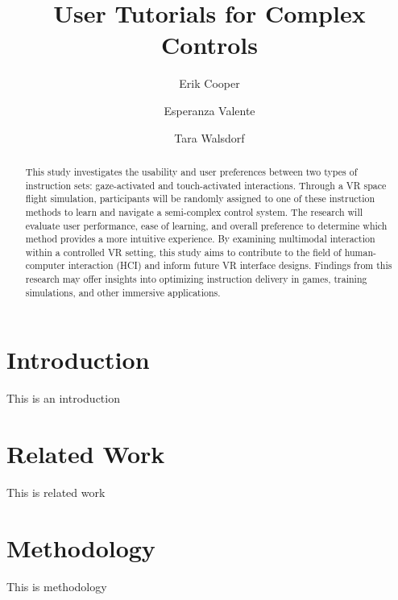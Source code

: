 \documentclass[acmlarge]{acmart}
\begin{document}
\title{User Tutorials for Complex Controls}

\author{Erik Cooper}

\author{Esperanza Valente}

\author{Tara Walsdorf}


\begin{abstract}
  This study investigates the usability and user preferences between two types of instruction sets: gaze-activated and touch-activated interactions. Through a VR space flight simulation, participants will be randomly assigned to one of these instruction methods to learn and navigate a semi-complex control system. The research will evaluate user performance, ease of learning, and overall preference to determine which method provides a more intuitive experience. By examining multimodal interaction within a controlled VR setting, this study aims to contribute to the field of human-computer interaction (HCI) and inform future VR interface designs. Findings from this research may offer insights into optimizing instruction delivery in games, training simulations, and other immersive applications.
\end{abstract}
\maketitle

\section{Introduction}
This is an introduction

\section{Related Work}
This is related work

\section{Methodology}
This is methodology



\end{document}
